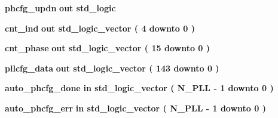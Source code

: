 \begin{DoxyCompactItemize}
\item 
{\bf phcfg\+\_\+updn}  {\bfseries {\bfseries \textcolor{keywordflow}{out}\textcolor{vhdlchar}{ }}} {\bfseries \textcolor{comment}{std\+\_\+logic}\textcolor{vhdlchar}{ }} 
\item 
{\bf cnt\+\_\+ind}  {\bfseries {\bfseries \textcolor{keywordflow}{out}\textcolor{vhdlchar}{ }}} {\bfseries \textcolor{comment}{std\+\_\+logic\+\_\+vector}\textcolor{vhdlchar}{ }\textcolor{vhdlchar}{(}\textcolor{vhdlchar}{ }\textcolor{vhdlchar}{ } \textcolor{vhdldigit}{4} \textcolor{vhdlchar}{ }\textcolor{keywordflow}{downto}\textcolor{vhdlchar}{ }\textcolor{vhdlchar}{ } \textcolor{vhdldigit}{0} \textcolor{vhdlchar}{ }\textcolor{vhdlchar}{)}\textcolor{vhdlchar}{ }} 
\item 
{\bf cnt\+\_\+phase}  {\bfseries {\bfseries \textcolor{keywordflow}{out}\textcolor{vhdlchar}{ }}} {\bfseries \textcolor{comment}{std\+\_\+logic\+\_\+vector}\textcolor{vhdlchar}{ }\textcolor{vhdlchar}{(}\textcolor{vhdlchar}{ }\textcolor{vhdlchar}{ } \textcolor{vhdldigit}{15} \textcolor{vhdlchar}{ }\textcolor{keywordflow}{downto}\textcolor{vhdlchar}{ }\textcolor{vhdlchar}{ } \textcolor{vhdldigit}{0} \textcolor{vhdlchar}{ }\textcolor{vhdlchar}{)}\textcolor{vhdlchar}{ }} 
\item 
{\bf pllcfg\+\_\+data}  {\bfseries {\bfseries \textcolor{keywordflow}{out}\textcolor{vhdlchar}{ }}} {\bfseries \textcolor{comment}{std\+\_\+logic\+\_\+vector}\textcolor{vhdlchar}{ }\textcolor{vhdlchar}{(}\textcolor{vhdlchar}{ }\textcolor{vhdlchar}{ } \textcolor{vhdldigit}{143} \textcolor{vhdlchar}{ }\textcolor{keywordflow}{downto}\textcolor{vhdlchar}{ }\textcolor{vhdlchar}{ } \textcolor{vhdldigit}{0} \textcolor{vhdlchar}{ }\textcolor{vhdlchar}{)}\textcolor{vhdlchar}{ }} 
\item 
{\bf auto\+\_\+phcfg\+\_\+done}  {\bfseries {\bfseries \textcolor{keywordflow}{in}\textcolor{vhdlchar}{ }}} {\bfseries \textcolor{comment}{std\+\_\+logic\+\_\+vector}\textcolor{vhdlchar}{ }\textcolor{vhdlchar}{(}\textcolor{vhdlchar}{ }\textcolor{vhdlchar}{ }\textcolor{vhdlchar}{ }\textcolor{vhdlchar}{ }{\bfseries {\bf N\+\_\+\+P\+LL}} \textcolor{vhdlchar}{-\/}\textcolor{vhdlchar}{ } \textcolor{vhdldigit}{1} \textcolor{vhdlchar}{ }\textcolor{keywordflow}{downto}\textcolor{vhdlchar}{ }\textcolor{vhdlchar}{ } \textcolor{vhdldigit}{0} \textcolor{vhdlchar}{ }\textcolor{vhdlchar}{)}\textcolor{vhdlchar}{ }} 
\item 
{\bf auto\+\_\+phcfg\+\_\+err}  {\bfseries {\bfseries \textcolor{keywordflow}{in}\textcolor{vhdlchar}{ }}} {\bfseries \textcolor{comment}{std\+\_\+logic\+\_\+vector}\textcolor{vhdlchar}{ }\textcolor{vhdlchar}{(}\textcolor{vhdlchar}{ }\textcolor{vhdlchar}{ }\textcolor{vhdlchar}{ }\textcolor{vhdlchar}{ }{\bfseries {\bf N\+\_\+\+P\+LL}} \textcolor{vhdlchar}{-\/}\textcolor{vhdlchar}{ } \textcolor{vhdldigit}{1} \textcolor{vhdlchar}{ }\textcolor{keywordflow}{downto}\textcolor{vhdlchar}{ }\textcolor{vhdlchar}{ } \textcolor{vhdldigit}{0} \textcolor{vhdlchar}{ }\textcolor{vhdlchar}{)}\textcolor{vhdlchar}{ }} 

\end{DoxyCompactItemize}
